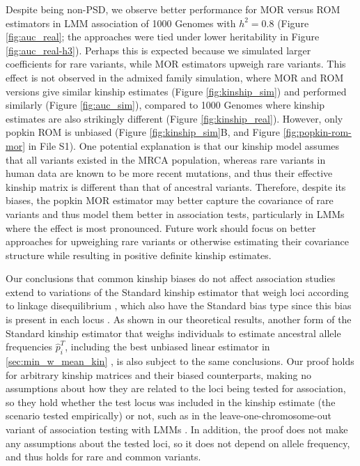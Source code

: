 \documentclass[9pt,twocolumn,twoside]{gsajnl}
\newcommand{\pith}{\hat{p}_i^T}
\begin{document}
Despite being non-PSD, we observe better performance for MOR versus ROM estimators in LMM association of 1000 Genomes with $h^2=0.8$ (Figure \ref{fig:auc_real}; the approaches were tied under lower heritability in Figure \ref*{fig:auc_real-h3}).
Perhaps this is expected because we simulated larger coefficients for rare variants, while MOR estimators upweigh rare variants.
This effect is not observed in the admixed family simulation, where MOR and ROM versions give similar kinship estimates (Figure \ref{fig:kinship_sim}) and performed similarly (Figure \ref{fig:auc_sim}), compared to 1000 Genomes where kinship estimates are also strikingly different (Figure \ref{fig:kinship_real}).
However, only popkin ROM is unbiased (Figure \ref{fig:kinship_sim}B, and Figure \ref*{fig:popkin-rom-mor} in File S1).
One potential explanation is that our kinship model assumes that all variants existed in the MRCA population, whereas rare variants in human data are known to be more recent mutations, and thus their effective kinship matrix is different than that of ancestral variants.
Therefore, despite its biases, the popkin MOR estimator may better capture the covariance of rare variants and thus model them better in association tests, particularly in LMMs where the effect is most pronounced.
Future work should focus on better approaches for upweighing rare variants or otherwise estimating their covariance structure while resulting in positive definite kinship estimates.

Our conclusions that common kinship biases do not affect association studies extend to variations of the Standard kinship estimator that weigh loci according to linkage disequilibrium \citep{speed_reevaluation_2017, wang_efficient_2017}, which also have the Standard bias type since this bias is present in each locus \citep{ochoa_estimating_2021}.
As shown in our theoretical results, another form of the Standard kinship estimator that weighs individuals to estimate ancestral allele frequencies $\pith$, including the best unbiased linear estimator in \cref{sec:min_w_mean_kin} \citep{astle_population_2009, thornton_roadtrips:_2010}, is also subject to the same conclusions.
Our proof holds for arbitrary kinship matrices and their biased counterparts, making no assumptions about how they are related to the loci being tested for association, so they hold whether the test locus was included in the kinship estimate (the scenario tested empirically) or not, such as in the leave-one-chromosome-out variant of association testing with LMMs \citep{lippert_fast_2011, yang_advantages_2014}.
In addition, the proof does not make any assumptions about the tested loci, so it does not depend on allele frequency, and thus holds for rare and common variants.
\end{document}
